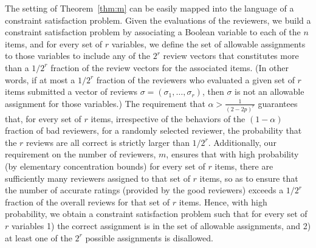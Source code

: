 \documentclass[anon,12pt]{colt2018}
\newcommand{\eps}{\epsilon}
\begin{document}
\medskip

\iffalse
\begin{theorem}\label{thm:mainCSP}
Fix a failure probability $\delta>0$ and accuracy parameter $\eps > 0$.  Consider a set of $n$ Boolean variables, $v_1,\ldots,v_n$ together with a set of nontrivial constraints on the values of every $r$-tuple.  That is, for all sets of $r$ variables, $t=\{v_{i1},\ldots,v_{ir}\},$ there is an associated set $C_t \subset \{0,1\}^r$ of possible assignments to the variables, with $|C_t| \le 2^{r} - 1.$  Provided there exists an assignment $\sigma$ that satisfies all the constraints, then there exists an algorithm that takes as input the set of constraints $\{C_t\}$ and the assignments that $\sigma$ assigns to a set of $k = O(2^r\log(1/\eps)$ randomly selected variables, and outputs an assignment $\sigma'$ that, with probability at least $1-\delta$, differs from $\sigma$ in at most $\eps n$ variables.
\end{theorem}
\fi

The setting of Theorem~\ref{thm:m} can be easily mapped into the language of a constraint satisfaction problem.  Given the evaluations of the reviewers, we build a constraint satisfaction problem by associating a Boolean variable to each of the $n$ items, and for every set of $r$ variables, we define the set of allowable assignments to those variables to include any of the $2^r$ review vectors that constitutes more than a $1/2^r$ fraction of the review vectors for the associated items.   (In other words, if at most a $1/2^r$ fraction of the reviewers who evaluated a given set of $r$ items submitted a vector of reviews $\sigma=(\sigma_1,\ldots,\sigma_r)$, then $\sigma$ is not an allowable assignment for those variables.)   The requirement that $\alpha > \frac{1}{(2-2p)^r}$ guarantees that, for every set of $r$ items, irrespective of the behaviors of the $(1-\alpha)$ fraction of bad reviewers, for a randomly selected reviewer, the probability that the $r$  reviews are all correct is strictly larger than $1/2^r$. Additionally, our requirement on the number of reviewers, $m$, ensures that with high probability (by elementary concentration bounds) for every set of $r$ items, there are sufficiently many reviewers assigned to that set of $r$ items, so as to ensure that the number of accurate ratings (provided by the good reviewers) exceeds a $1/2^r$ fraction of the overall reviews for that set of $r$ items.  Hence, with high probability, we obtain a constraint satisfaction problem such that for every set of $r$ variables 1) the correct assignment is in the set of allowable assignments, and 2) at least one of the $2^r$ possible assignments is disallowed.
\end{document}
